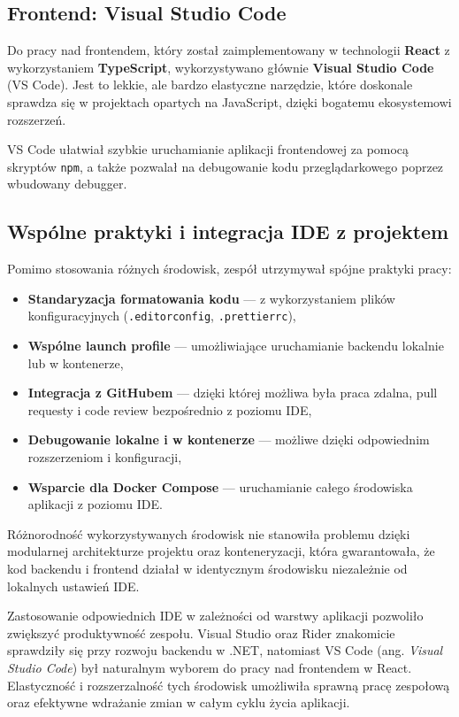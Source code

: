 \pagebreak

\subsection{Frontend: Visual Studio Code}

Do pracy nad frontendem, który został zaimplementowany w technologii \textbf{React} z wykorzystaniem \textbf{TypeScript}, wykorzystywano głównie \textbf{Visual Studio Code} (VS Code). Jest to lekkie, ale bardzo elastyczne narzędzie, które doskonale sprawdza się w projektach opartych na JavaScript, dzięki bogatemu ekosystemowi rozszerzeń.

VS Code ułatwiał szybkie uruchamianie aplikacji frontendowej za pomocą skryptów \texttt{npm}, a także pozwalał na debugowanie kodu przeglądarkowego poprzez wbudowany debugger.

\subsection{Wspólne praktyki i integracja IDE z projektem}

Pomimo stosowania różnych środowisk, zespół utrzymywał spójne praktyki pracy:

\begin{itemize}
    \item \textbf{Standaryzacja formatowania kodu} --- z wykorzystaniem plików konfiguracyjnych \linebreak (\texttt{.editorconfig}, \texttt{.prettierrc}),
    \item \textbf{Wspólne launch profile} --- umożliwiające uruchamianie backendu lokalnie lub w kontenerze,
    \item \textbf{Integracja z GitHubem} --- dzięki której możliwa była praca zdalna, pull requesty i code review bezpośrednio z poziomu IDE,
    \item \textbf{Debugowanie lokalne i w kontenerze} --- możliwe dzięki odpowiednim rozszerzeniom i konfiguracji,
    \item \textbf{Wsparcie dla Docker Compose} --- uruchamianie całego środowiska aplikacji z poziomu IDE.
\end{itemize}

Różnorodność wykorzystywanych środowisk nie stanowiła problemu dzięki modularnej architekturze projektu oraz konteneryzacji, która gwarantowała, że kod backendu i frontend działał w identycznym środowisku niezależnie od lokalnych ustawień IDE.

Zastosowanie odpowiednich IDE w zależności od warstwy aplikacji pozwoliło zwiększyć produktywność zespołu. Visual Studio oraz Rider znakomicie sprawdziły się przy rozwoju backendu w .NET, natomiast VS Code (ang. \textit{Visual Studio Code}) był naturalnym wyborem do pracy nad frontendem w React. Elastyczność i rozszerzalność tych środowisk umożliwiła sprawną pracę zespołową oraz efektywne wdrażanie zmian w całym cyklu życia aplikacji.

